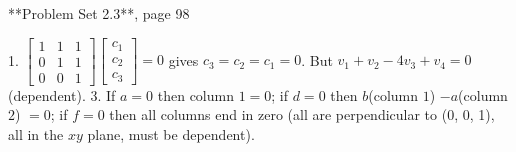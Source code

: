 **Problem Set 2.3**, page 98

1. \(\begin{bmatrix}1&1&1\\ 0&1&1\\ 0&0&1\end{bmatrix}\)\(\begin{bmatrix}c_{1}\\ c_{2}\\ c_{3}\end{bmatrix}=0\) gives \(c_{3}=c_{2}=c_{1}=0\). But \(v_{1}+v_{2}-4v_{3}+v_{4}=0\) (dependent).
3. If \(a=0\) then column \(1=0\); if \(d=0\) then \(b\)(column \(1\)) \(-\)\(a\)(column \(2\)) \(=0\); if \(f=0\) then all columns end in zero (all are perpendicular to (0, 0, 1), all in the \(xy\) plane, must be dependent).

 